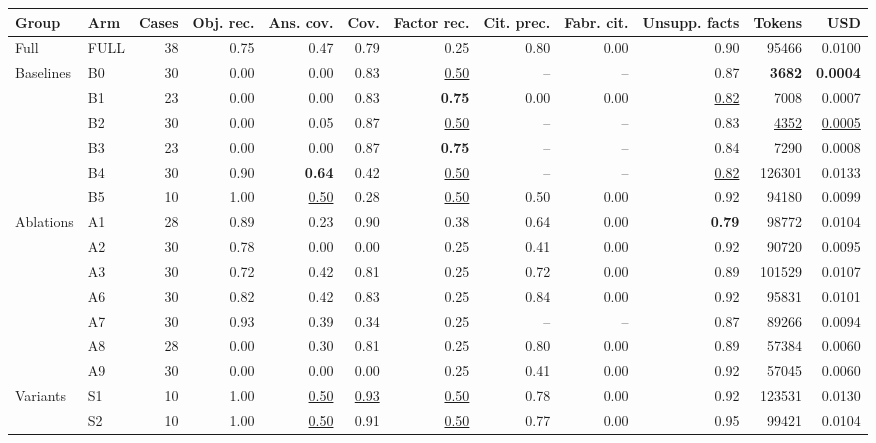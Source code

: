 \begin{table}[t]
\centering\footnotesize
\begin{adjustbox}{max width=\textwidth}
\begin{tabular}{@{}llrrrrrrrrrr@{}}
\toprule
Group & Arm & Cases & Obj. rec. & Ans. cov. & Cov. & Factor rec. & Cit. prec. & Fabr. cit. & Unsupp. facts & Tokens & USD \\
\midrule
Full & FULL & 38 & 0.75 & 0.47 & 0.79 & 0.25 & 0.80 & 0.00 & 0.90 & 95466 & 0.0100 \\
\midrule
Baselines & B0 & 30 & 0.00 & 0.00 & 0.83 & \underline{0.50} & -- & -- & 0.87 & \textbf{3682} & \textbf{0.0004} \\
 & B1 & 23 & 0.00 & 0.00 & 0.83 & \textbf{0.75} & 0.00 & 0.00 & \underline{0.82} & 7008 & 0.0007 \\
 & B2 & 30 & 0.00 & 0.05 & 0.87 & \underline{0.50} & -- & -- & 0.83 & \underline{4352} & \underline{0.0005} \\
 & B3 & 23 & 0.00 & 0.00 & 0.87 & \textbf{0.75} & -- & -- & 0.84 & 7290 & 0.0008 \\
 & B4 & 30 & 0.90 & \textbf{0.64} & 0.42 & \underline{0.50} & -- & -- & \underline{0.82} & 126301 & 0.0133 \\
 & B5 & 10 & 1.00 & \underline{0.50} & 0.28 & \underline{0.50} & 0.50 & 0.00 & 0.92 & 94180 & 0.0099 \\
\midrule
Ablations & A1 & 28 & 0.89 & 0.23 & 0.90 & 0.38 & 0.64 & 0.00 & \textbf{0.79} & 98772 & 0.0104 \\
 & A2 & 30 & 0.78 & 0.00 & 0.00 & 0.25 & 0.41 & 0.00 & 0.92 & 90720 & 0.0095 \\
 & A3 & 30 & 0.72 & 0.42 & 0.81 & 0.25 & 0.72 & 0.00 & 0.89 & 101529 & 0.0107 \\
 & A6 & 30 & 0.82 & 0.42 & 0.83 & 0.25 & 0.84 & 0.00 & 0.92 & 95831 & 0.0101 \\
 & A7 & 30 & 0.93 & 0.39 & 0.34 & 0.25 & -- & -- & 0.87 & 89266 & 0.0094 \\
 & A8 & 28 & 0.00 & 0.30 & 0.81 & 0.25 & 0.80 & 0.00 & 0.89 & 57384 & 0.0060 \\
 & A9 & 30 & 0.00 & 0.00 & 0.00 & 0.25 & 0.41 & 0.00 & 0.92 & 57045 & 0.0060 \\
\midrule
Variants & S1 & 10 & 1.00 & \underline{0.50} & \underline{0.93} & \underline{0.50} & 0.78 & 0.00 & 0.92 & 123531 & 0.0130 \\
 & S2 & 10 & 1.00 & \underline{0.50} & 0.91 & \underline{0.50} & 0.77 & 0.00 & 0.95 & 99421 & 0.0104 \\

\end{tabular}
\end{adjustbox}
\end{table}
